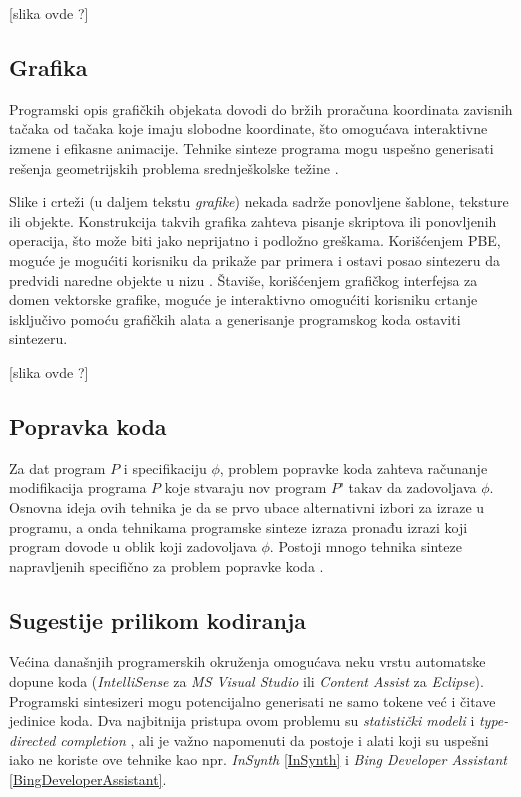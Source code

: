 [slika ovde ?]


\subsection{Grafika}
\label{subsec:Grafika}

Programski opis grafičkih objekata dovodi do bržih proračuna koordinata zavisnih tačaka od tačaka koje imaju slobodne koordinate, što omogućava interaktivne izmene i efikasne animacije. Tehnike sinteze programa mogu uspešno generisati rešenja geometrijskih problema srednješkolske težine \cite{SynthesizingGeometryConstructions}.

Slike i crteži (u daljem tekstu \emph{grafike}) nekada sadrže ponovljene šablone, teksture ili objekte. Konstrukcija takvih grafika zahteva pisanje skriptova ili ponovljenih operacija, što može biti jako neprijatno i podložno greškama. Korišćenjem PBE, moguće je mogućiti korisniku da prikaže par primera i ostavi posao sintezeru da predvidi naredne objekte u nizu \cite{Backpropagation}. Štaviše, korišćenjem grafičkog interfejsa za domen vektorske grafike, moguće je interaktivno omogućiti korisniku crtanje isključivo pomoću grafičkih alata a generisanje programskog koda ostaviti sintezeru.

[slika ovde ?]


\subsection{Popravka koda}
\label{subsec:PopravkaKoda}

Za dat program $P$ i specifikaciju $\phi$, problem popravke koda zahteva računanje modifikacija programa $P$ koje stvaraju nov program $P’$ takav da zadovoljava $\phi$. Osnovna ideja ovih tehnika je da se prvo ubace alternativni izbori za izraze u programu, a onda tehnikama programske sinteze izraza pronađu izrazi koji program dovode u oblik koji zadovoljava $\phi$. Postoji mnogo tehnika sinteze napravljenih specifično za problem popravke koda \cite{Qlose, ProgramRepairAsAGame}.


\subsection{Sugestije prilikom kodiranja}
\label{subsec:SugestijePrilikomKodiranja}

Većina današnjih programerskih okruženja omogućava neku vrstu automatske dopune koda (\emph{IntelliSense} za \emph{MS Visual Studio} ili \emph{Content Assist} za \emph{Eclipse}). Programski sintesizeri mogu potencijalno generisati ne samo tokene već i čitave jedinice koda. Dva najbitnija pristupa ovom problemu su \emph{statistički modeli} \cite{CCWSLM} i \emph{type-directed completion} \cite{TDCOPE}, ali je važno napomenuti da postoje i alati koji su uspešni iako ne koriste ove tehnike kao npr. \emph{InSynth} \ref{InSynth} i \emph{Bing Developer Assistant} \ref{BingDeveloperAssistant}.


